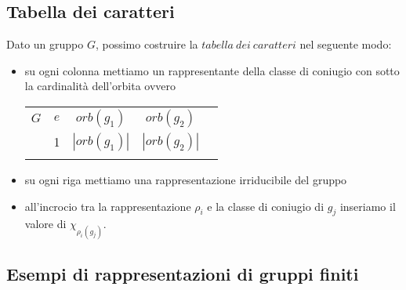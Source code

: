 \documentclass[11pt]{article}
\theoremstyle{plain}
\theoremstyle{definition}
\theoremstyle{remark}
\begin{document}
\subsection{Tabella dei caratteri}


Dato un gruppo $G$, possimo costruire la $tabella\ dei\ caratteri$ nel seguente modo:
\begin{itemize}
\item su ogni colonna mettiamo un rappresentante della classe di coniugio con sotto la cardinalità dell'orbita ovvero

\begin{table}[!h]
\centering
\begin{tabular}{|c|c|c|c|c}
\hline
$G$  & $e$ & $orb(g_1)$ & $orb(g_2)$ & \\
 & 1 & $|orb(g_1)|$ & $|orb(g_2)|$ & \\
\hline
 & &  & \\
\end{tabular}
\end{table}

\item su ogni riga mettiamo una rappresentazione irriducibile del gruppo
\item all'incrocio tra la rappresentazione $\rho_i$ e la classe di coniugio di $g_j$ inseriamo il valore di $\chi_{\rho_i(g_j)}$.


\end{itemize}



\subsection{Esempi di rappresentazioni di gruppi finiti}
\end{document}
